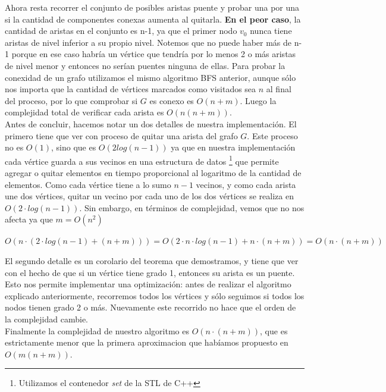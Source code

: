 Ahora resta recorrer el conjunto de posibles aristas puente y probar una por una si la cantidad de componentes conexas aumenta al quitarla. \textbf{En el peor caso}, la cantidad de aristas en el 
conjunto es n-1, ya que el primer nodo $v_0$ nunca tiene aristas de nivel inferior a su propio nivel. Notemos que no puede haber más de n-1 porque en ese caso habría un vértice que tendría 
por lo menos 2 o más aristas de nivel menor y entonces no serían puentes ninguna de ellas. Para probar la conexidad de un grafo utilizamos el mismo algoritmo BFS anterior, aunque 
sólo nos importa que la cantidad de vértices marcados como visitados sea $n$ al final del proceso, por lo que comprobar si $G$ es conexo es $O(n+m)$. Luego la complejidad total de verificar 
cada arista es $O(n(n+m))$. \\
Antes de concluir, hacemos notar un dos detalles de nuestra implementación. El primero tiene que ver con proceso de quitar una arista del grafo $G$. Este proceso no es $O(1)$, sino que es 
$O(2 log (n-1))$ ya que en nuestra implementación cada vértice guarda a sus vecinos en una estructura de datos \footnote{Utilizamos el contenedor \textit{set} de la STL de C++} que permite 
agregar o quitar elementos en tiempo proporcional al logaritmo de la cantidad de elementos. Como cada vértice tiene a lo sumo $n-1$ vecinos, y como cada arista une dos vértices, quitar un 
vecino por cada uno de los dos vértices se realiza en $O(2\cdot log(n-1))$. Sin embargo, en términos de complejidad, vemos que no nos afecta ya que $m=O(n^2)$

\begin{center}
 $O(n\cdot(2\cdot log(n-1) + (n+m))) = O(2\cdot n\cdot log(n-1) + n\cdot(n+m)) = O(n\cdot(n+m))$
\end{center}

El segundo detalle es un corolario del teorema que demostramos, y tiene que ver con el hecho de que si un vértice tiene grado 1, entonces su arista es un puente. Esto nos permite implementar 
una optimización: antes de realizar el algoritmo explicado anteriormente, recorremos todos los vértices y sólo seguimos si todos los nodos tienen grado 2 o más. Nuevamente este recorrido no hace 
que el orden de la complejidad cambie. \\

Finalmente la complejidad de nuestro algoritmo es $O(n\cdot(n+m))$, que es estrictamente menor que la primera aproximacion que habíamos propuesto en $O(m(n+m))$.
